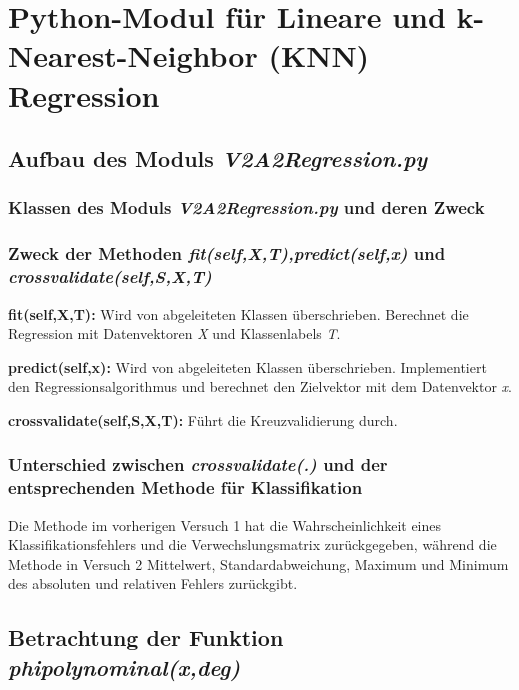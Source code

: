 \section{Python-Modul für Lineare und k-Nearest-Neighbor (KNN) Regression}


\subsection{
    Aufbau des Moduls \textit{V2A2\textunderscore Regression.py}
}

\subsubsection{ Klassen des Moduls \textit{V2A2\textunderscore Regression.py} und deren Zweck}

\subsubsection{ Zweck der Methoden \textit{fit(self,X,T),predict(self,x)} und \textit{crossvalidate(self,S,X,T)}}

\noindent
\vspace{5px}
\textbf{fit(self,X,T):} Wird von abgeleiteten Klassen überschrieben. Berechnet die Regression mit Datenvektoren \textit{X} und Klassenlabels \textit{T}.

\noindent
\vspace{5px}
\textbf{predict(self,x):} Wird von abgeleiteten Klassen überschrieben. Implementiert den Regressionsalgorithmus und berechnet den Zielvektor mit dem Datenvektor \textit{x}.

\noindent
\vspace{5px}
\textbf{crossvalidate(self,S,X,T):} Führt die Kreuzvalidierung durch.


\subsubsection{ Unterschied  zwischen \textit{crossvalidate(.)} und der entsprechenden Methode für Klassifikation}

\noindent
\vspace{5px}
Die Methode im vorherigen Versuch 1 hat die Wahrscheinlichkeit eines Klassifikationsfehlers und die Verwechslungsmatrix zurückgegeben, während die Methode in Versuch 2 Mittelwert, Standardabweichung, Maximum und Minimum des absoluten und relativen Fehlers zurückgibt. 

\subsection{
    Betrachtung der Funktion \textit{phi\textunderscore polynominal(x,deg)}
}

